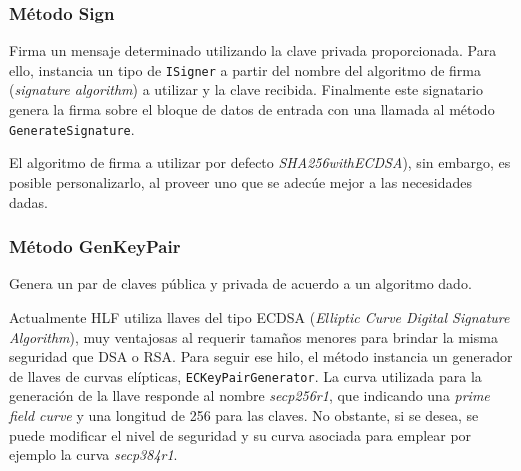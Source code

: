 \subsubsection{M\'etodo Sign}

Firma un mensaje determinado utilizando la clave privada proporcionada. Para ello, instancia un tipo de \texttt{ISigner} a partir del nombre del algoritmo de firma (\emph{signature algorithm}) a utilizar y la clave recibida. Finalmente este signatario genera la firma sobre el bloque de datos de entrada con una llamada al m\'etodo \texttt{GenerateSignature}.

El algoritmo de firma a utilizar por defecto \emph{SHA256withECDSA}), sin embargo, es posible personalizarlo, al proveer uno que se adec\'ue mejor a las necesidades dadas.

\subsubsection{M\'etodo GenKeyPair}
Genera un par de claves pública y privada de acuerdo a un algoritmo dado.

Actualmente HLF utiliza llaves del tipo ECDSA (\emph{Elliptic Curve Digital Signature Algorithm}), muy ventajosas al requerir tamaños menores para brindar la misma seguridad que DSA o RSA. Para seguir ese hilo, el m\'etodo instancia un generador de llaves de curvas el\'ipticas, \texttt{ECKeyPairGenerator}. La curva utilizada para la generaci\'on de la llave responde al nombre \emph{secp256r1}, que indicando una \emph{prime field curve} y una longitud de 256 para las claves. No obstante, si se desea, se puede modificar el nivel de seguridad y su curva asociada para emplear por ejemplo la curva \emph{secp384r1}.




